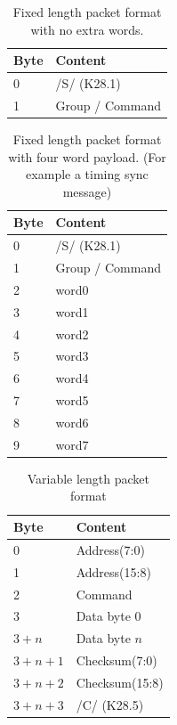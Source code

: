 \documentclass{dune}
\begin{document}
\begin{table}[h!]
  \centering
  \begin{tabular}{@{}ll@{}} \toprule
    Byte & Content \\ \midrule
    0 & /S/ (K28.1) \\
    1 & Group / Command \\ \bottomrule
  \end{tabular}
  \caption{Fixed length packet format with no extra words.}
  \label{tab:sync}
\end{table}

\begin{table}[h!]
  \centering
  \begin{tabular}{@{}ll@{}} \toprule
    Byte & Content \\ \midrule
    0 & /S/ (K28.1) \\
    1 & Group / Command \\ 
    2 & word0 \\
    3 & word1 \\
    4 & word2 \\
    5 & word3 \\ 
    6 & word4 \\
    7 & word5 \\
    8 & word6 \\
    9 & word7 \\ 
    \bottomrule
  \end{tabular}
  \caption{Fixed length packet format with four word payload. (For example a timing sync message)}
  \label{tab:sync-extra-words}
\end{table}

\begin{table}[h!]
  \centering
  \begin{tabular}{@{}ll@{}} \toprule
    Byte & Content \\ \midrule
    0 & Address(7:0) \\
    1 & Address(15:8) \\
    2 & Command \\
    3 & Data byte 0 \\ 
    $3 + n$ & Data byte $n$ \\ 
    $3 + n + 1$ & Checksum(7:0) \\
    $3 + n + 2$ & Checksum(15:8) \\
    $3 + n + 3$ & /C/ (K28.5) \\ \bottomrule
  \end{tabular}
  \caption{Variable length packet format}
  \label{tab:async}
\end{table}
\end{document}
